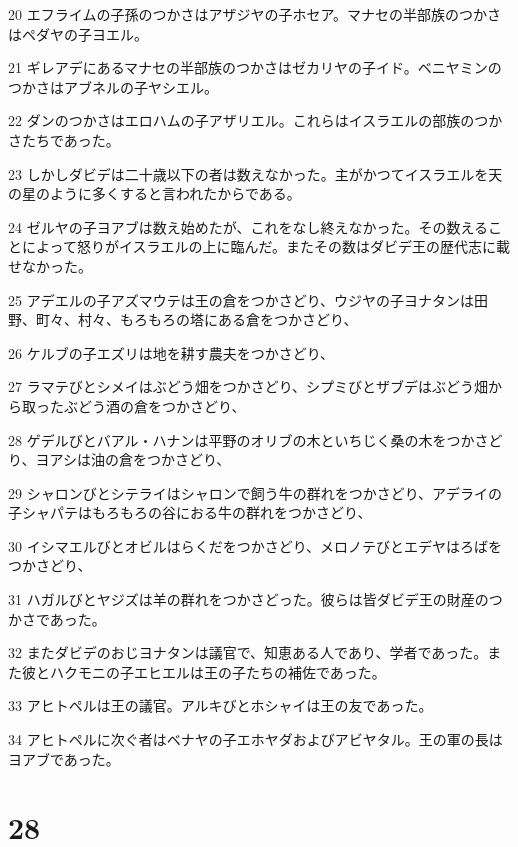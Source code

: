 \par 20 エフライムの子孫のつかさはアザジヤの子ホセア。マナセの半部族のつかさはペダヤの子ヨエル。
\par 21 ギレアデにあるマナセの半部族のつかさはゼカリヤの子イド。ベニヤミンのつかさはアブネルの子ヤシエル。
\par 22 ダンのつかさはエロハムの子アザリエル。これらはイスラエルの部族のつかさたちであった。
\par 23 しかしダビデは二十歳以下の者は数えなかった。主がかつてイスラエルを天の星のように多くすると言われたからである。
\par 24 ゼルヤの子ヨアブは数え始めたが、これをなし終えなかった。その数えることによって怒りがイスラエルの上に臨んだ。またその数はダビデ王の歴代志に載せなかった。
\par 25 アデエルの子アズマウテは王の倉をつかさどり、ウジヤの子ヨナタンは田野、町々、村々、もろもろの塔にある倉をつかさどり、
\par 26 ケルブの子エズリは地を耕す農夫をつかさどり、
\par 27 ラマテびとシメイはぶどう畑をつかさどり、シプミびとザブデはぶどう畑から取ったぶどう酒の倉をつかさどり、
\par 28 ゲデルびとバアル・ハナンは平野のオリブの木といちじく桑の木をつかさどり、ヨアシは油の倉をつかさどり、
\par 29 シャロンびとシテライはシャロンで飼う牛の群れをつかさどり、アデライの子シャパテはもろもろの谷におる牛の群れをつかさどり、
\par 30 イシマエルびとオビルはらくだをつかさどり、メロノテびとエデヤはろばをつかさどり、
\par 31 ハガルびとヤジズは羊の群れをつかさどった。彼らは皆ダビデ王の財産のつかさであった。
\par 32 またダビデのおじヨナタンは議官で、知恵ある人であり、学者であった。また彼とハクモニの子エヒエルは王の子たちの補佐であった。
\par 33 アヒトペルは王の議官。アルキびとホシャイは王の友であった。
\par 34 アヒトペルに次ぐ者はベナヤの子エホヤダおよびアビヤタル。王の軍の長はヨアブであった。

\chapter{28}

